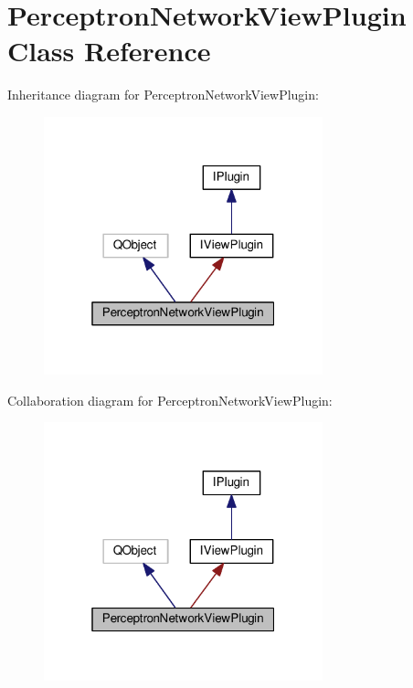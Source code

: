 \hypertarget{class_perceptron_network_view_plugin}{}\section{Perceptron\+Network\+View\+Plugin Class Reference}
\label{class_perceptron_network_view_plugin}


Inheritance diagram for Perceptron\+Network\+View\+Plugin\+:\nopagebreak
\begin{figure}[H]
\begin{center}
\leavevmode
\includegraphics[width=229pt]{class_perceptron_network_view_plugin__inherit__graph}
\end{center}
\end{figure}


Collaboration diagram for Perceptron\+Network\+View\+Plugin\+:\nopagebreak
\begin{figure}[H]
\begin{center}
\leavevmode
\includegraphics[width=229pt]{class_perceptron_network_view_plugin__coll__graph}
\end{center}
\end{figure}
